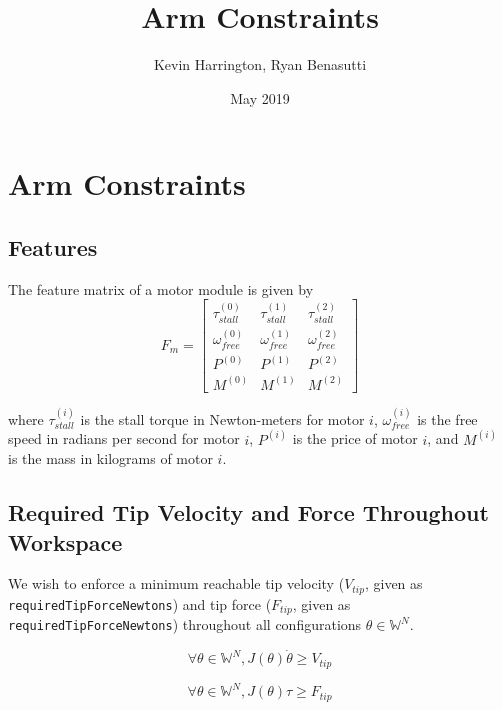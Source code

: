 \documentclass{article}
\title{Arm Constraints}
\author{Kevin Harrington, Ryan Benasutti}
\date{May 2019}
\begin{document}
\maketitle

\FloatBarrier
\section{Arm Constraints}

\FloatBarrier
\subsection{Features}

The feature matrix of a motor module is given by
\begin{equation}
    F_m =
    \begin{bmatrix}
        \tau_{stall}^{(0)} & \tau_{stall}^{(1)} & \tau_{stall}^{(2)} \\[6pt]
        \omega_{free}^{(0)} & \omega_{free}^{(1)} & \omega_{free}^{(2)} \\[6pt]
        P^{(0)} & P^{(1)} & P^{(2)} \\[6pt]
        M^{(0)} & M^{(1)} & M^{(2)}
    \end{bmatrix}
\end{equation}

where $\tau_{stall}^{(i)}$ is the stall torque in Newton-meters for motor $i$, $\omega_{free}^{(i)}$
is the free speed in radians per second for motor $i$, $P^{(i)}$ is the price of motor $i$, and
$M^{(i)}$ is the mass in kilograms of motor $i$.

\FloatBarrier
\subsection{Required Tip Velocity and Force Throughout Workspace}

We wish to enforce a minimum reachable tip velocity ($V_{tip}$, given as
\texttt{requiredTipForceNewtons}) and tip force ($F_{tip}$, given as
\texttt{requiredTipForceNewtons}) throughout all configurations $\theta \in \mathbb{W}^N$.

\begin{equation}
    \forall \theta \in \mathbb{W}^N, J(\theta) \dot{\theta} \geq V_{tip}
    \label{eq:vtip_constraint}
\end{equation}

\begin{equation}
    \forall \theta \in \mathbb{W}^N, J(\theta) \tau \geq F_{tip}
    \label{eq:ftip_constraint}
\end{equation}
\end{document}
